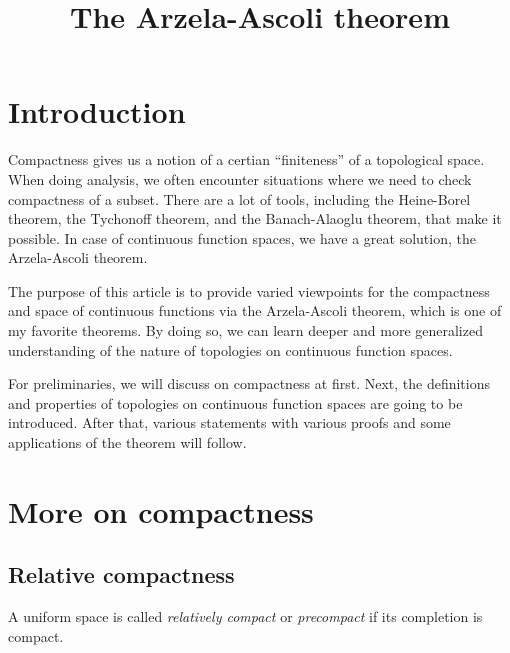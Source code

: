 \documentclass{../exp}
\title{The Arzela-Ascoli theorem}
\begin{document}
\maketitle

\section{Introduction}
Compactness gives us a notion of a certian ``finiteness'' of a topological space.
When doing analysis, we often encounter situations where we need to check compactness of a subset.
There are a lot of tools, including the Heine-Borel theorem, the Tychonoff theorem, and the Banach-Alaoglu theorem, that make it possible.
In case of continuous function spaces, we have a great solution, the Arzela-Ascoli theorem.

The purpose of this article is to provide varied viewpoints for the compactness and space of continuous functions via the Arzela-Ascoli theorem, which is one of my favorite theorems.
By doing so, we can learn deeper and more generalized understanding of the nature of topologies on continuous function spaces.

For preliminaries, we will discuss on compactness at first.
Next, the definitions and properties of topologies on continuous function spaces are going to be introduced.
After that, various statements with various proofs and some applications of the theorem will follow.




\section{More on compactness}
\subsection{Relative compactness}

\begin{defn}
A uniform space is called \emph{relatively compact} or \emph{precompact} if its completion is compact.
\end{defn}
\end{document}
